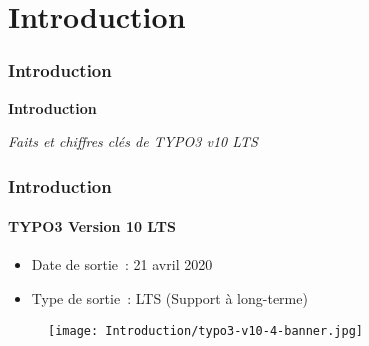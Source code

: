 %

\section{Introduction}
\begin{frame}[fragile]
	\frametitle{Introduction}

	\begin{center}\huge{\color{typo3darkgrey}\textbf{Introduction}}\end{center}
	\begin{center}\large{\textit{Faits et chiffres clés de TYPO3 v10 LTS}}\end{center}

\end{frame}


\begin{frame}[fragile]
	\frametitle{Introduction}
	\framesubtitle{TYPO3 Version 10 LTS}

	\begin{itemize}
		\item Date de sortie~: 21 avril 2020
		\item Type de sortie~: LTS (Support à long-terme)
	\end{itemize}

	\begin{figure}
		\texttt{[image: Introduction/typo3-v10-4-banner.jpg]}
	\end{figure}

\end{frame}


